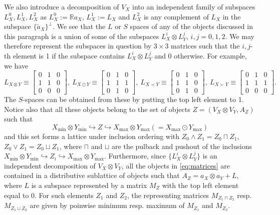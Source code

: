 \documentclass[12pt]{article}
\theoremstyle{definition}
\theoremstyle{remark}
\begin{document}
%
We also introduce a decomposition of $V_X$ into an independent family of subspaces
$L_X^0,L^1_X,L^2_X$ as
$L_X^0:=\mathbb Ra_X$, $L_X^1:=L_X$ and $L_X^2$ is any complement of $L_X$ in the subspace
$\{\tilde a_X\}^\perp$. We see that the $L$ or $S$ spaces of any of the objects discussed
in this paragraph is a union of some of the subspaces $L_X^i\otimes L_Y^j$, $i,j=0,1,2$. 
We may therefore represent the subspaces in question by $3\times 3$ matrices such that 
the $i,j$-th element is 1 if the subspace contains $L_X^i\otimes L_Y^j$ and 0 otherwise.
For example, we have
\begin{equation}\label{eq:matrices}
L_{X\otimes Y}\equiv \begin{bmatrix} 0& 1&0\\ 1 &1 &0\\ 0 & 0&0\end{bmatrix}, \ 
L_{X\odot Y}\equiv \begin{bmatrix} 0& 1&0\\ 1 &1 &1\\ 0 & 1&0\end{bmatrix},\ 
L_{X\prec Y}\equiv \begin{bmatrix} 0& 1&0\\ 1 &1 &0\\ 0 & 1 &0\end{bmatrix}, \ 
L_{X\succ Y}\equiv \begin{bmatrix} 0& 1&0\\ 1 &1 &1\\ 0 & 0&0\end{bmatrix}.
\end{equation}
The $S$-spaces can be obtained from these by putting the top left  element to 1. Notice
also that all these objects belong to the set of objects $Z=(V_X\otimes V_Y, A_Z)$ such
that
\[
X_{\min}\otimes Y_{\min}\hookrightarrow  Z \hookrightarrow X_{\max}\otimes
Y_{\max}(=X_{\max}\odot Y_{\max})
\]
and this set forms a lattice under inclusion ordering with $Z_0\wedge Z_1=Z_0\sqcap Z_1$,
$Z_0\vee Z_1=Z_0\sqcup Z_1$, where $\sqcap$ and $\sqcup$ are the pulback and pushout 
of the inclusions $X_{\min}\otimes Y_{\min}\hookrightarrow Z_i \hookrightarrow
X_{\max}\otimes Y_{\max}$. Furthermore, since $\{L_X^i\otimes L_Y^j\}$ is an independent
decomposition of $V_X\otimes V_Y$, all the objects  in \eqref{eq:matrices} are contained in a
distributive sublattice of objects such that $A_Z=a_X\otimes a_Y+L$, where $L$ is a subspace
represented by a  matrix $M_Z$ with the top left element equal to 0.
For such elements $Z_1$ and $Z_2$, the representing matrices  $M_{Z_1\sqcap Z_2}$ resp.
$M_{Z_1\sqcup Z_2}$ are given by
poinwise minimum resp. maximum of $M_{Z_1}$ and $M_{Z_2}$.
\end{document}
